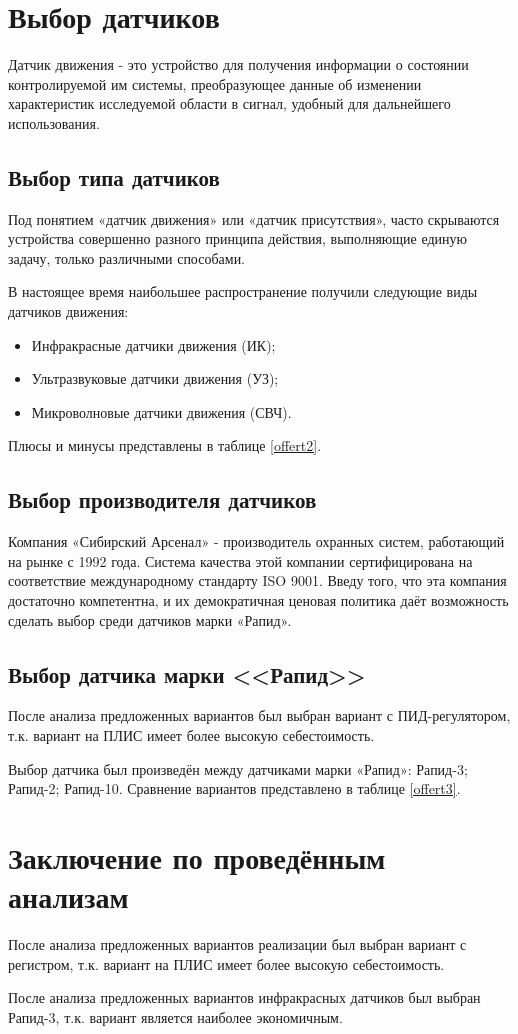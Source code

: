 	\section{Выбор датчиков}
		Датчик движения - это устройство для получения информации о состоянии контролируемой им системы, преобразующее данные об изменении характеристик исследуемой области в сигнал, удобный для дальнейшего использования.
		\subsection{Выбор типа датчиков}
			Под понятием «датчик движения» или «датчик присутствия», часто скрываются устройства совершенно разного принципа действия, выполняющие единую задачу, только различными способами.

			В настоящее время наибольшее распространение получили следующие виды датчиков движения:
			\begin{itemize}
				\item Инфракрасные датчики движения (ИК);
				\item Ультразвуковые датчики движения (УЗ);
				\item Микроволновые датчики движения (СВЧ).
			\end{itemize}
			Плюсы и минусы представлены в таблице \ref{offert2}.
			
		\subsection{Выбор производителя датчиков}
			Компания «Сибирский Арсенал» - производитель охранных систем, работающий на рынке с 1992 года. Система качества этой компании сертифицирована на соответствие международному стандарту ISO 9001.
			Введу того, что эта компания достаточно компетентна, и их демократичная ценовая политика даёт возможность сделать выбор среди датчиков марки «Рапид».
		\subsection{Выбор датчика марки <<Рапид>>}
			После анализа предложенных вариантов был выбран вариант с ПИД-регулятором, т.к. вариант на ПЛИС имеет более высокую себестоимость.

			Выбор датчика был произведён между датчиками марки «Рапид»: Рапид-3; Рапид-2; Рапид-10. Сравнение вариантов представлено в таблице \ref{offert3}.
			
	\section{Заключение по проведённым анализам}
		После анализа предложенных вариантов реализации был выбран вариант с регистром, т.к. вариант на ПЛИС имеет более высокую себестоимость.

		После анализа предложенных вариантов инфракрасных датчиков был выбран  Рапид-3, т.к. вариант является наиболее экономичным.

